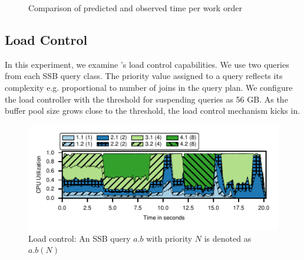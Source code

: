 \begin{figure}[]
	\centering
	\caption{Comparison of predicted and observed time per work order}
	\label{fig:pred-vs-observed-time-per-wo}
	\vspace{-1em}
\end{figure}

\subsection{Load Control}
In this experiment, we examine \sys{}'s load control capabilities.
We use two queries from each SSB query class.
The priority value assigned to a query reflects its complexity e.g. proportional to number of joins in the query plan.
We configure the load controller with the threshold for suspending queries as 56 GB. 
As the buffer pool size grows close to the threshold, the load control mechanism kicks in.

\begin{figure}[]
	\centering
	\includegraphics[width=\columnwidth]{figures/load-control-cpu-util.pdf}
	\vspace{-2.5em}	
	\caption{Load control: An SSB query $a.b$ with priority $N$ is denoted as $a.b (N)$}
	\label{fig:load-control-cpu-util}
	\vspace{-1em}	
\end{figure}

